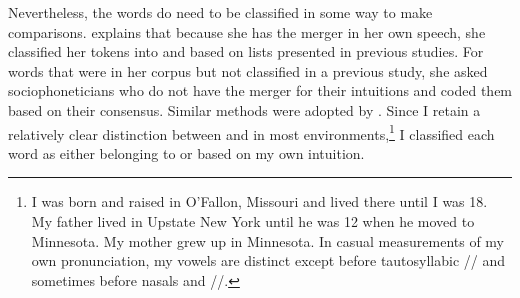 Nevertheless, the words do need to be classified in some way to make comparisons. \citet[133]{hall_lew_2009_diss} explains that because she has the merger in her own speech, she classified her tokens into \lot and \thought based on lists presented in previous studies. For words that were in her corpus but not classified in a previous study, she asked sociophoneticians who do not have the merger for their intuitions and coded them based on their consensus. Similar methods were adopted by \citet[note 4]{podesva_etal_2015}. Since I retain a relatively clear distinction between \lot and \thought in most environments,\footnote{I was born and raised in O'Fallon, Missouri and lived there until I was 18. My father lived in Upstate New York until he was 12 when he moved to Minnesota. My mother grew up in Minnesota. In casual measurements of my own pronunciation, my vowels are distinct except before tautosyllabic // and sometimes before nasals and //.} I classified each word as either belonging to \lot or \thought based on my own intuition.


